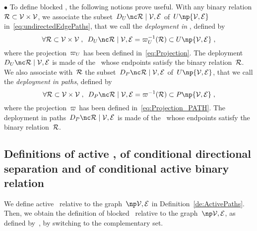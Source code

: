 \documentclass[12pt]{article}
\def\citep#1{\cite{#1}}
\begin{document}
{{\noindent \(\bullet\)
To define blocked \undirectedEdgePaths, 
the following notions prove useful. 
With any binary relation \( \mathcal{R} \subset {\cal V}\times{\cal V} \),
we associate the subset~\( \DeploymentInUPaths{\relation}{\OrientedGraph} \)
of~\( \UPATH\np{\OrientedGraph} \) in~\eqref{eq:undirectedEdgePaths},
that we call the \emph{deployment in \undirectedEdgePaths}, 
defined by 
\begin{equation}
  \forall \relation \subset \VERTEX\times\VERTEX 
  \eqsepv 
  \DeploymentInUPaths{\relation}{\OrientedGraph}
  = \Projection_{\UPATH}^{-1}(\relation) \subset \UPATH\np{\OrientedGraph} 
  \eqfinv
  \label{eq:DeploymentInUPaths}
\end{equation}
where the projection~\( \varpi_{U} \) has been defined
in~\eqref{eq:Projection}.
The deployment \(\DeploymentInUPaths{\relation}{\OrientedGraph} \)
is made of the \undirectedEdgePaths\ whose endpoints satisfy the 
binary relation~\( \mathcal{R} \).
%
We also associate with~\( \mathcal{R} \)
the subset~\( \DeploymentInPaths{\relation}{\OrientedGraph} \)
of~\( \UPATH\np{\OrientedGraph} \),
that we call the \emph{deployment in paths},
defined by 
\begin{equation}
  \forall \relation \subset \VERTEX\times\VERTEX 
  \eqsepv 
  \DeploymentInPaths{\relation}{\OrientedGraph}
  = \Projection^{-1}(\relation) \subset \PATH\np{\OrientedGraph} 
  \eqfinv
  \label{eq:DeploymentInPaths}
\end{equation}
where the projection~\( \varpi \) has been defined
in~\eqref{eq:Projection_PATH}.
The deployment in paths~\( \DeploymentInPaths{\relation}{\OrientedGraph} \)
is made of the \EdgePaths\  whose endpoints satisfy the 
binary relation~\( \mathcal{R} \).


\subsection{Definitions of active \undirectedEdgePaths, of  conditional
  directional separation and of conditional active binary relation}
\label{Definition_of_the_conditional_directional_separation_binary_relation}


We define active \undirectedEdgePaths\ relative to the graph~$\npOrientedGraph$
in Definition~\ref{de:ActivePaths}.
Then, we  obtain the definition of blocked \undirectedEdgePaths\ relative to the
graph~$\npOrientedGraph$, as defined by~\citep{PEARL1986357}, by switching to the
complementary set.

}}
\end{document}
